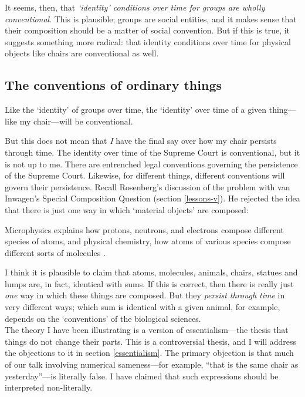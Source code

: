 \documentclass[11pt]{article}
\newenvironment{squote}{%
\begin{spacing}{1}
\begin{list}{}{%
\setlength{\labelwidth}{0pt}%
\rightmargin\leftmargin%
}
\item\relax
}{%
\end{list}%
\end{spacing}
}
\begin{document}
\begin{spacing}{1.5}
It seems, then, that {\em `identity' conditions over time for groups
  are wholly conventional}.  This is plausible; groups are social
entities, and it makes sense that their composition should be a matter
of social convention.  But if this is true, it suggests something more
radical: that identity conditions over time for physical objects like
chairs are conventional as well.

\subsection{The conventions of ordinary things}
\label{chair-ref}
Like the `identity' of groups over time, the `identity' over time of a
given thing---like my chair---will be conventional.

But this does not mean that {\em I} have the final say over how my
chair persists through time.  The identity over time of the Supreme
Court is conventional, but it is not up to me.  There are entrenched
legal conventions governing the persistence of the Supreme Court.
Likewise, for different things, different conventions will govern
their persistence.  Recall Rosenberg's discussion of the problem with
van Inwagen's Special Composition Question (section \ref{lessons-v}).
He rejected the idea that there is just one way in which `material
objects' are composed:

\begin{squote}
Microphysics explains how protons, neutrons, and electrons compose
different species of atoms, and physical chemistry, how atoms of
various species compose different sorts of molecules
\citep[706]{rosenberg1993}.
\end{squote}

I think it is plausible to claim that atoms, molecules, animals,
chairs, statues and lumps are, in fact, identical with sums.  If this
is correct, then there is really just {\em one} way in which these
things are composed.  But they {\em persist through time} in very
different ways; which sum is identical with a given animal, for
example, depends on the `conventions' of the biological sciences. \\

The theory I have been illustrating is a version of essentialism---the
thesis that things do not change their parts.  This is a controversial
thesis, and I will address the objections to it in section
\ref{essentialism}.  The primary objection is that much of our talk
involving numerical sameness---for example, ``that is the same chair
as yesterday''---is literally false.  I have claimed that such
expressions should be interpreted non-literally.



\end{spacing}
\end{document}
